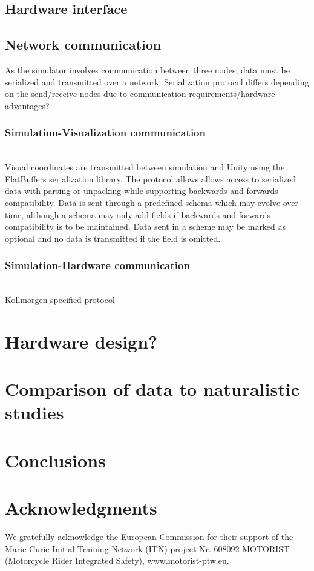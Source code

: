 \documentclass[11pt,a4paper,reqno]{amsart}
\begin{document}
\subsection{Hardware interface}
\subsection{Network communication}
As the simulator involves communication between three nodes, data must be serialized and transmitted over a network.
Serialization protocol differs depending on the send/receive nodes due to communication requirements/hardware
advantages?
\subsubsection{Simulation-Visualization communication} \\
Visual coordinates are transmitted between simulation and Unity using the FlatBuffers serialization library.
The protocol allows allows access to serialized data with parsing or unpacking while supporting backwards and forwards
compatibility.
Data is sent through a predefined schema which may evolve over time, although a schema may only add fields if backwards
and forwards compatibility is to be maintained.
Data sent in a scheme may be marked as optional and no data is transmitted if the field is omitted.
\subsubsection{Simulation-Hardware communication} \\
Kollmorgen specified protocol \\

\section{Hardware design?}

\section{Comparison of data to naturalistic studies}

\section{Conclusions}

\section{Acknowledgments}
We gratefully acknowledge the European Commission for their support of the Marie Curie Initial Training Network (ITN)
project Nr. 608092 MOTORIST (Motorcycle Rider Integrated Safety), www.motorist-ptw.eu.



\end{document}
